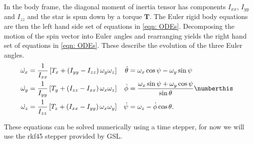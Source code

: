 \documentclass[/home/greg/Thesis/main/main.tex]{subfiles}
\begin{document}
In the body frame, the diagonal moment of inertia tensor has components
$I_{xx}$, $I_{yy}$ and $I_{zz}$ and the star is spun down by a torque
$\boldsymbol{T}$. The Euler rigid body equations are then the left hand side
set of equations in \eqref{eqn: ODEs}. Decomposing the motion of the spin
vector into Euler angles and rearranging yields the right hand set of equations
in \eqref{eqn: ODEs}. These describe the evolution of the three Euler angles.
\begin{align*}
\dot{\omega_{x}} & = \frac{1}{I_{xx}}\left[T_{x} + 
                      \left(I_{yy} - I_{zz}\right) \omega_{y} \omega_{z}\right] 
& 
\dot{\theta} & = \omega_{x} \cos \psi - \omega_{y} \sin \psi
\\
\dot{\omega_{y}} & = \frac{1}{I_{yy}}\left[T_{y} + 
                      \left(I_{zz} - I_{xx}\right) \omega_{x} \omega_{z}\right] 
& 
\dot{\phi} & = \frac{\omega_{x} \sin \psi + \omega_{y} \cos \psi}{\sin \theta}
\numberthis \label{eqn: ODEs}
\\
\dot{\omega_{z}} & =\frac{1}{I_{zz}}\left[T_{z} + 
                      \left(I_{xx} - I_{yy}\right) \omega_{x} \omega_{y}\right]
& 
\dot{\psi} & = \omega_{z} - \dot{\phi} \cos \theta.
\end{align*}

These equations can be solved numerically using a time stepper, for now
we will use the rkf45 stepper provided by GSL. %

\end{document}
